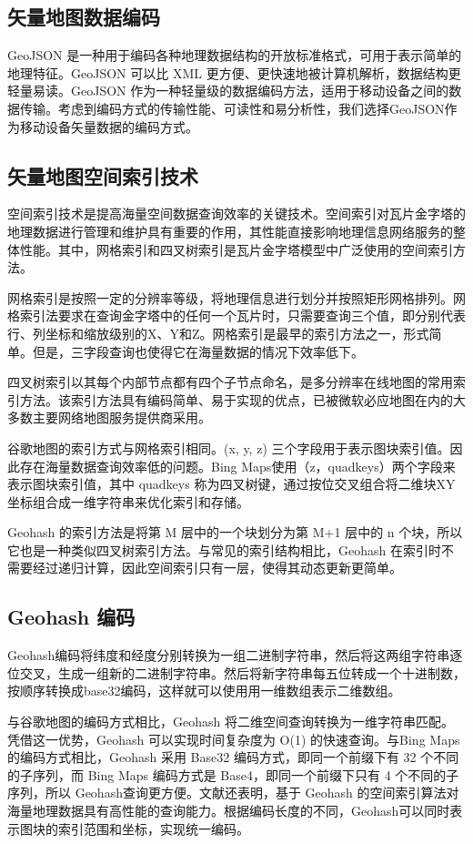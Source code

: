 \subsection{矢量地图数据编码}
GeoJSON 是一种用于编码各种地理数据结构的开放标准格式，可用于表示简单的地理特征。GeoJSON 可以比 XML 更方便、更快速地被计算机解析，数据结构更轻量易读。GeoJSON 作为一种轻量级的数据编码方法，适用于移动设备之间的数据传输。考虑到编码方式的传输性能、可读性和易分析性，我们选择GeoJSON作为移动设备矢量数据的编码方式。
\subsection{矢量地图空间索引技术}
空间索引技术是提高海量空间数据查询效率的关键技术。空间索引对瓦片金字塔的地理数据进行管理和维护具有重要的作用，其性能直接影响地理信息网络服务的整体性能。其中，网格索引和四叉树索引是瓦片金字塔模型中广泛使用的空间索引方法。\par
网格索引是按照一定的分辨率等级，将地理信息进行划分并按照矩形网格排列。网格索引法要求在查询金字塔中的任何一个瓦片时，只需要查询三个值，即分别代表行、列坐标和缩放级别的X、Y和Z。网格索引是最早的索引方法之一，形式简单。但是，三字段查询也使得它在海量数据的情况下效率低下。\par
四叉树索引以其每个内部节点都有四个子节点命名，是多分辨率在线地图的常用索引方法。该索引方法具有编码简单、易于实现的优点，已被微软必应地图在内的大多数主要网络地图服务提供商采用。\par
谷歌地图的索引方式与网格索引相同。(x, y, z) 三个字段用于表示图块索引值。因此存在海量数据查询效率低的问题。Bing Maps使用（z，quadkeys）两个字段来表示图块索引值，其中 quadkeys 称为四叉树键，通过按位交叉组合将二维块XY坐标组合成一维字符串来优化索引和存储。\par
Geohash 的索引方法是将第 M 层中的一个块划分为第 M+1 层中的 n 个块，所以它也是一种类似四叉树索引方法。与常见的索引结构相比，Geohash 在索引时不需要经过递归计算，因此空间索引只有一层，使得其动态更新更简单。

\subsection{Geohash 编码}
Geohash编码将纬度和经度分别转换为一组二进制字符串，然后将这两组字符串逐位交叉，生成一组新的二进制字符串。然后将新字符串每五位转成一个十进制数，按顺序转换成base32编码，这样就可以使用用一维数组表示二维数组。\par
与谷歌地图的编码方式相比，Geohash 将二维空间查询转换为一维字符串匹配。凭借这一优势，Geohash 可以实现时间复杂度为 O(1)  的快速查询。与Bing Maps的编码方式相比，Geohash 采用 Base32 编码方式，即同一个前缀下有 32 个不同的子序列，而 Bing Maps 编码方式是 Base4，即同一个前缀下只有 4 个不同的子序列，所以 Geohash查询更方便。文献还表明，基于 Geohash 的空间索引算法对海量地理数据具有高性能的查询能力。根据编码长度的不同，Geohash可以同时表示图块的索引范围和坐标，实现统一编码。

